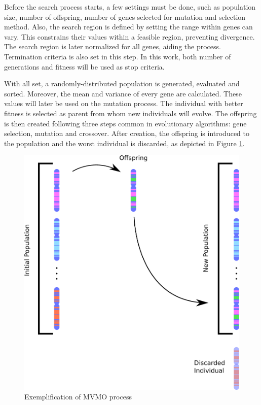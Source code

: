 Before the search process starts, a few settings must be done, such as population size, number of offspring, number of genes selected for mutation and selection method. Also, the search region is defined by setting the range within genes can vary. This constrains their values within a feasible region, preventing divergence. The search region is later normalized for all genes, aiding the process. Termination criteria is also set in this step. In this work, both number of generations and fitness will be used as stop criteria.

With all set, a randomly-distributed population is generated, evaluated and sorted. Moreover, the mean and variance of every gene are calculated. These values will later be used on the mutation process. The individual with better fitness is selected as parent from whom new individuals will evolve. The offspring is then created following three steps common in evolutionary algorithms: gene selection, mutation and crossover. After creation, the offspring is introduced to the population and the worst individual is discarded, as depicted in Figure \ref{fig: MVMOprocess}.

\begin{figure}[h]
	\caption{Exemplification of MVMO process}
	\begin{center}
		\includegraphics[scale=.2]{Images/MVMO_process.eps}
	\end{center}
	\label{fig: MVMOprocess}
\end{figure}

